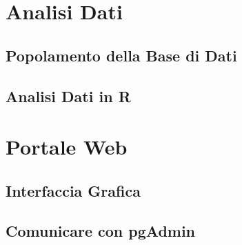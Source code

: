 \documentclass{article}
\begin{document}
\clearpage

\section{Analisi Dati}
\subsection{Popolamento della Base di Dati}
\subsection{Analisi Dati in R}



\clearpage
\section{Portale Web}
\subsection{Interfaccia Grafica}
\subsection{Comunicare con pgAdmin}
\end{document}
